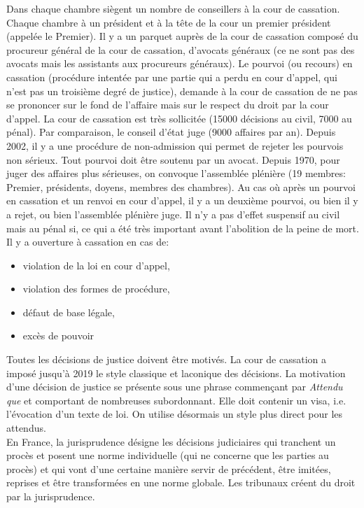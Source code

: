 \documentclass[math]{cours}
\begin{document}
Dans chaque chambre siègent un nombre de conseillers à la cour de cassation.
Chaque chambre à un président et à la tête de la cour un premier président (appelée le Premier).
Il y a un parquet auprès de la cour de cassation composé du procureur général de la cour de cassation, d'avocats généraux (ce ne sont pas des avocats mais les assistants aux procureurs généraux).
Le pourvoi (ou recours) en cassation (procédure intentée par une partie qui a perdu en cour d'appel, qui n'est pas un troisième degré de justice),
demande à la cour de cassation de ne pas se prononcer sur le fond de l'affaire mais sur le respect du droit par la cour d'appel.
La cour de cassation est très sollicitée (15000 décisions au civil, 7000 au pénal).
Par comparaison, le conseil d'état juge (9000 affaires par an).
Depuis 2002, il y a une procédure de non-admission qui permet de rejeter les pourvois non sérieux.
Tout pourvoi doit être soutenu par un avocat.
Depuis 1970, pour juger des affaires plus sérieuses, on convoque l'assemblée plénière (19 membres: Premier, présidents, doyens, membres des chambres).
Au cas où après un pourvoi en cassation et un renvoi en cour d'appel, il y a un deuxième pourvoi, ou bien il y a rejet, ou bien l'assemblée plénière juge.
Il n'y a pas d'effet suspensif au civil mais au pénal si, ce qui a été très important avant l'abolition de la peine de mort.
Il y a ouverture à cassation en cas de:
\begin{itemize}
	\item violation de la loi en cour d'appel,
	\item violation des formes de procédure,
	\item défaut de base légale,
	\item excès de pouvoir
\end{itemize}
Toutes les décisions de justice doivent être motivés. La cour de cassation a imposé jusqu'à 2019 le style classique et laconique des décisions.
La motivation d'une décision de justice se présente sous une phrase commençant par \textit{Attendu que} et comportant de nombreuses subordonnant.
Elle doit contenir un visa, i.e. l'évocation d'un texte de loi.
On utilise désormais un style plus direct pour les attendus. \\
En France, la jurisprudence désigne les décisions judiciaires qui tranchent un procès et posent une norme individuelle (qui ne concerne que les parties au procès) et qui vont d'une certaine manière servir de précédent, être imitées, reprises et être transformées en une norme globale.
Les tribunaux créent du droit par la jurisprudence.
\end{document}
